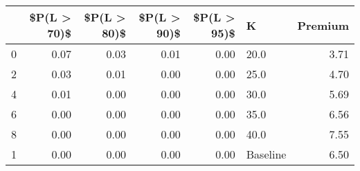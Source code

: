 \begin{tabular}{lrrrrlr}
\toprule
{} &  \$P(L > 70)\$ &  \$P(L > 80)\$ &  \$P(L > 90)\$ &  \$P(L > 95)\$ &         K &  Premium \\
\midrule
0 &         0.07 &         0.03 &         0.01 &         0.00 &      20.0 &     3.71 \\
2 &         0.03 &         0.01 &         0.00 &         0.00 &      25.0 &     4.70 \\
4 &         0.01 &         0.00 &         0.00 &         0.00 &      30.0 &     5.69 \\
6 &         0.00 &         0.00 &         0.00 &         0.00 &      35.0 &     6.56 \\
8 &         0.00 &         0.00 &         0.00 &         0.00 &      40.0 &     7.55 \\
1 &         0.00 &         0.00 &         0.00 &         0.00 &  Baseline &     6.50 \\
\bottomrule
\end{tabular}
